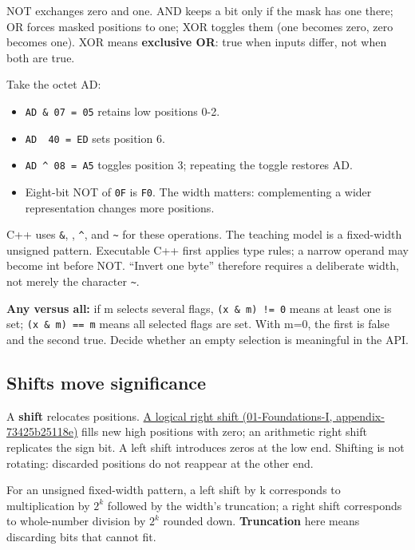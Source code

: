 NOT exchanges zero and one. AND keeps a bit only if the mask has one there; OR forces masked positions to one; XOR toggles them (one becomes zero, zero becomes one). XOR means \textbf{exclusive OR}: true when inputs differ, not when both are true.

Take the octet AD:

\begin{itemize}
\tightlist
\item
  \texttt{AD\ \&\ 07\ =\ 05} retains low positions 0-2.
\item
  \texttt{AD\ \textbar{}\ 40\ =\ ED} sets position 6.
\item
  \texttt{AD\ \^{}\ 08\ =\ A5} toggles position 3; repeating the toggle restores AD.
\item
  Eight-bit NOT of \texttt{0F} is \texttt{F0}. The width matters: complementing a wider representation changes more positions.
\end{itemize}

C++ uses \texttt{\&}, \texttt{\textbar{}}, \texttt{\^{}}, and \texttt{\textasciitilde{}} for these operations. The teaching model is a fixed-width unsigned pattern. Executable C++ first applies type rules; a narrow operand may become int before NOT. ``Invert one byte'' therefore requires a deliberate width, not merely the character \texttt{\textasciitilde{}}.

\textbf{Any versus all:} if m selects several flags, \texttt{(x\ \&\ m)\ !=\ 0} means at least one is set; \texttt{(x\ \&\ m)\ ==\ m} means all selected flags are set. With m=0, the first is false and the second true. Decide whether an empty selection is meaningful in the API.

\subsection{Shifts move significance}\label{05-engine-i-ch001-shifts-move-significance}

A \textbf{shift} relocates positions. \href{../01-Foundations-I/main.pdf\#nameddest=appendix-73425b25118e}{A logical right shift (01-Foundations-I, appendix-73425b25118e)} fills new high positions with zero; an arithmetic right shift replicates the sign bit. A left shift introduces zeros at the low end. Shifting is not rotating: discarded positions do not reappear at the other end.

For an unsigned fixed-width pattern, a left shift by k corresponds to multiplication by \(2^k\) followed by the width's truncation; a right shift corresponds to whole-number division by \(2^k\) rounded down. \textbf{Truncation} here means discarding bits that cannot fit.

